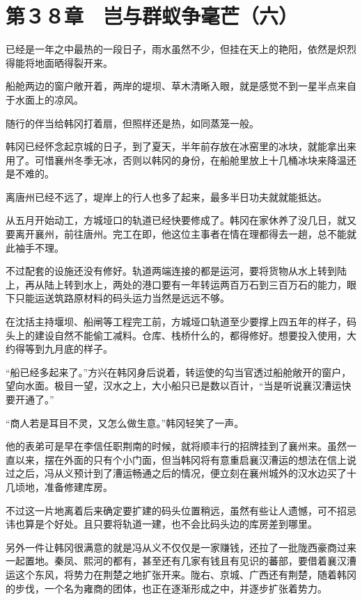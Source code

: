 \section{第３８章　岂与群蚁争毫芒（六）}

已经是一年之中最热的一段日子，雨水虽然不少，但挂在天上的艳阳，依然是炽烈得能将地面晒得裂开来。

船舱两边的窗户敞开着，两岸的堤坝、草木清晰入眼，就是感觉不到一星半点来自于水面上的凉风。

随行的伴当给韩冈打着扇，但照样还是热，如同蒸笼一般。

韩冈已经怀念起京城的日子，到了夏天，半年前存放在冰窑里的冰块，就能拿出来用了。可惜襄州冬季无冰，否则以韩冈的身份，在船舱里放上十几桶冰块来降温还是不难的。

离唐州已经不远了，堤岸上的行人也多了起来，最多半日功夫就就能抵达。

从五月开始动工，方城垭口的轨道已经快要修成了。韩冈在家休养了没几日，就又要离开襄州，前往唐州。完工在即，他这位主事者在情在理都得去一趟，总不能就此袖手不理。

不过配套的设施还没有修好。轨道两端连接的都是运河，要将货物从水上转到陆上，再从陆上转到水上，两处的港口要有一年转运两百万石到三百万石的能力，眼下只能运送筑路原材料的码头运力当然是远远不够。

在沈括主持堰坝、船闸等工程完工前，方城垭口轨道至少要撑上四五年的样子，码头上的建设自然不能偷工减料。仓库、栈桥什么的，都得修好。想要投入使用，大约得等到九月底的样子。

“船已经多起来了。”方兴在韩冈身后说着，转运使的勾当官透过船舱敞开的窗户，望向水面。极目一望，汉水之上，大小船只已是数以百计，“当是听说襄汉漕运快要开通了。”

“商人若是耳目不灵，又怎么做生意。”韩冈轻笑了一声。

他的表弟可是早在李信任职荆南的时候，就将顺丰行的招牌挂到了襄州来。虽然一直以来，摆在外面的只有个小门面，但当韩冈将有意重启襄汉漕运的想法在信上说过之后，冯从义预计到了漕运畅通之后的情况，便立刻在襄州城外的汉水边买了十几顷地，准备修建库房。

不过这一片地离着后来确定要扩建的码头位置稍远，虽然有些让人遗憾，可不招忌讳也算是个好处。且只要将轨道一建，也不会比码头边的库房差到哪里。

另外一件让韩冈很满意的就是冯从义不仅仅是一家赚钱，还拉了一批陇西豪商过来一起置地。秦凤、熙河的都有，甚至还有几家有钱且有见识的蕃部，要借着襄汉漕运这个东风，将势力在荆楚之地扩张开来。陇右、京城、广西还有荆楚，随着韩冈的步伐，一个名为雍商的团体，也正在逐渐形成之中，并逐步扩张着势力。

